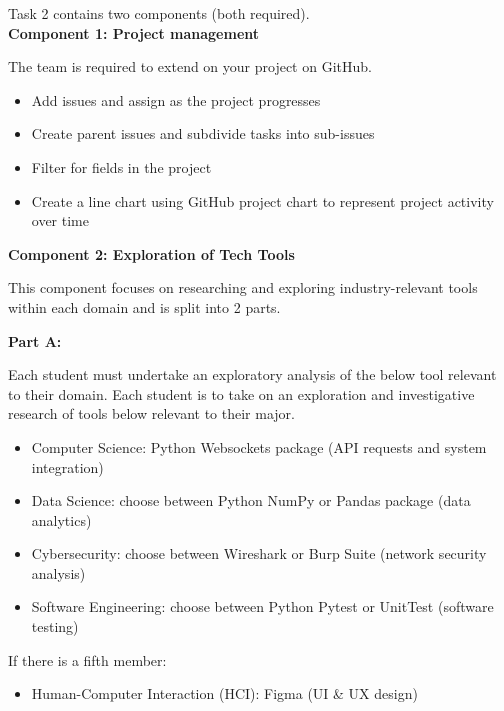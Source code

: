 \documentclass[a4paper, 11pt]{report}
\begin{document}
\begin{enumerate}
Task 2 contains two components (both required).\\[2mm]

\textbf{Component 1: Project management}

The team is required to extend on your project on GitHub.

\begin{itemize}
    \item Add issues and assign as the project progresses
    \item Create parent issues and subdivide tasks into sub-issues
    \item Filter for fields in the project
    \item Create a line chart using GitHub project chart to represent project activity over time
\end{itemize} 

\vspace{4ex}

\textbf{Component 2: Exploration of Tech Tools}

This component focuses on researching and exploring industry-relevant tools within each domain and is split into 2 parts.

\vspace{2ex}


\textbf{Part A:}

Each student must undertake an exploratory analysis of the below tool relevant to their domain. 
Each student is to take on an exploration and investigative research of tools below relevant to their major. 

\begin{itemize}
    \item Computer Science: Python Websockets package (API requests and system integration)
    \item Data Science: choose between Python NumPy or Pandas package (data analytics)
    \item Cybersecurity: choose between Wireshark or Burp Suite (network security analysis)
    \item Software Engineering: choose between Python Pytest or UnitTest (software testing)
\end{itemize}
If there is a fifth member:
\begin{itemize}
    \item Human-Computer Interaction (HCI): Figma (UI \& UX design)
\end{itemize}

\vspace{4ex}


\end{enumerate}
\end{document}
